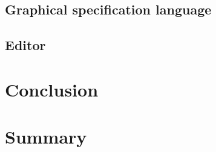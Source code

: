 \documentclass[twoside, openright, 12pt]{book}
\begin{document}
\section{Graphical specification language}
\label{evaluation_gsl}


\section{Editor}
\label{evaluation_editor}


\cleardoublepage
\chapter{Conclusion}
\label{conclusion}
\blindtext



\cleardoublepage
\chapter{Summary}
\label{summary}
\blindtext







\cleardoublepage
\DeclareRobustCommand{\citeext}[1]{\citeauthor{#1}~\cite{#1}}




\end{document}
